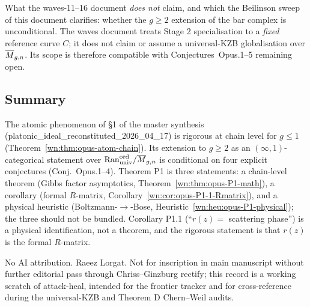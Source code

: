 What the waves-11--16 document \emph{does not} claim, and which the
Beilinson sweep of this document clarifies: whether the $g \ge 2$
extension of the bar complex is unconditional. The waves document
treats Stage 2 specialisation to a \emph{fixed} reference curve $C$; it
does not claim or assume a universal-KZB globalisation over
$\overline{M}_{g,n}$. Its scope is therefore compatible with
Conjectures~Opus.1--5 remaining open.

\subsection*{Summary}

The atomic phenomenon of §1 of the master synthesis
(platonic\_ideal\_reconstituted\_2026\_04\_17) is rigorous at chain
level for $g \le 1$
(Theorem~\ref{wn:thm:opus-atom-chain}). Its extension to $g \ge 2$ as
an $(\infty,1)$-categorical statement over
$\mathrm{Ran}^{\mathrm{ord}}_{\mathrm{univ}} / \overline{M}_{g,n}$ is conditional on
four explicit conjectures (Conj.~Opus.1--4). Theorem P1 is three
statements: a chain-level theorem (Gibbs factor asymptotics,
Theorem~\ref{wn:thm:opus-P1-math}), a corollary (formal $R$-matrix,
Corollary~\ref{wn:cor:opus-P1-1-Rmatrix}), and a physical heuristic
(Boltzmann-$\to$-Bose, Heuristic~\ref{wn:heu:opus-P1-physical}); the
three should not be bundled. Corollary P1.1 (``$r(z) = $ scattering
phase'') is a physical identification, not a theorem, and the rigorous
statement is that $r(z)$ is the formal $R$-matrix.

No AI attribution. Raeez Lorgat. Not for inscription in main manuscript
without further editorial pass through Chriss--Ginzburg rectify; this
record is a working scratch of attack-heal, intended for the frontier
tracker and for cross-reference during the universal-KZB and Theorem D
Chern--Weil audits.

